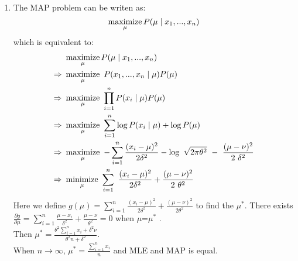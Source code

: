 \documentclass[a4paper]{article}
\begin{document}
\begin{enumerate}
\begin{enumerate}
  \item
    The MAP problem can be writen as:
    \begin{equation*}
      \operatorname*{maximize}_{\mu} P(\mu \mid x_1,...,x_n)
    \end{equation*}
    which is equivalent to:
    \begin{equation*}
      \begin{aligned}
      &\maximize_{\mu} P(\mu\mid x_1,...,x_n)\\
      \Rightarrow &\maximize_{\mu} P(x_1,...,x_n\mid\mu)P(\mu)\\
      \Rightarrow &\maximize_{\mu} \prod_{i=1}^n P(x_i\mid\mu)P(\mu)\\
      \Rightarrow &\maximize_{\mu} \sum_{i=1}^n \log P(x_i\mid\mu) + \log P(\mu)\\
      \Rightarrow &\maximize_{\mu} -\sum_{i=1}^n \frac{(x_i-\mu)^2}{2\delta^2} - \log \sqrt{2\pi\theta^2} - \frac{(\mu - \nu)^2}{2 \delta^2}\\
      \Rightarrow &\minimize_{\mu} \sum_{i=1}^n \frac{(x_i-\mu)^2}{2\delta^2} + \frac{(\mu - \nu)^2}{2 \theta^2}\\
      \end{aligned}
    \end{equation*}
    Here we define $g(\mu) = \sum_{i=1}^n \frac{(x_i-\mu)^2}{2\delta^2} + \frac{(\mu - \nu)^2}{2 \theta^2}$ to find the $\mu^*$. There exists $\frac{\partial g}{\partial \mu} = \sum_{i=1}^n \frac{\mu-x_i}{\delta^2} + \frac{\mu - \nu}{\theta^2} = 0$ when $\mu$=$\mu^*$ .\\
    Then $\mu^* = \frac{\theta^2\sum_{i=1}^n x_i + \delta^2\nu}{\theta^2n+\delta^2}$.\\
    When $n \rightarrow \infty$, $\mu^* = \frac{\sum_{i=1}^n x_i}{n}$ and MLE and MAP is equal.
  \end{enumerate}


\end{enumerate}
\end{document}
